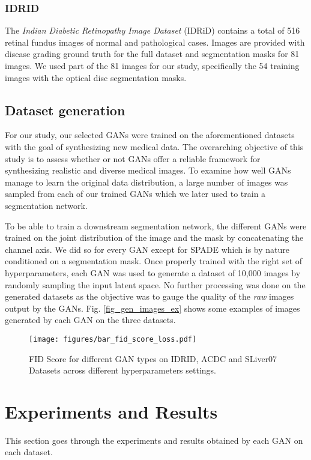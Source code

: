 \documentclass[preprint,12pt, authoryear]{elsarticle}
\begin{document}
\subsubsection{IDRID}
The {\em Indian Diabetic Retinopathy Image Dataset} (IDRiD) \citep{Porwal2018IndianDR} contains a total of 516 retinal fundus images of normal and pathological cases. Images are provided with disease grading ground truth for the full dataset and segmentation masks for 81 images. We used part of the 81 images for our study, specifically the 54 training images with the optical disc segmentation masks.




\subsection{Dataset generation}

For our study, our selected GANs were trained on the aforementioned datasets with the goal of synthesizing new medical data.  The overarching objective of this study is to assess whether or not GANs offer a reliable framework for synthesizing realistic and diverse medical images. To examine how well GANs manage to learn the original data distribution, a large number of images was sampled from each of our trained GANs which we later used to train a segmentation network.

To be able to train a downstream segmentation network, the different GANs were trained on the joint distribution of the image and the mask by concatenating the channel axis.  We did so for every GAN except for SPADE which is by nature conditioned on a segmentation mask.
Once properly trained with the right set of hyperparameters, each GAN was used to generate a dataset of 10,000 images by randomly sampling the input latent space. No further processing was done on the generated datasets as the objective was to gauge the quality of the {\em raw} images output by the GANs. Fig. \ref{fig_gen_images_ex} shows some examples of images generated by each GAN on the three datasets.

\begin{figure}[tp]
\centering
\texttt{[image: figures/bar\_fid\_score\_loss.pdf]}
\caption{\small FID Score for different GAN types on IDRID, ACDC and SLiver07 Datasets across different hyperparameters settings.}
\label{fig_fid_loss_acdc}
\end{figure}


\section{Experiments and Results}
\label{sec:experiments}
This section goes through the experiments and results obtained by each GAN on each dataset.  
\end{document}

